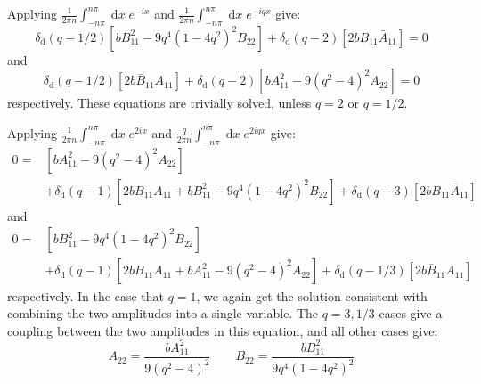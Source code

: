 \documentclass[api,pof,pre,12pt,a4paper]{revtex4-1}
\newcommand{\beqn}{\begin{equation}}
\newcommand{\eeqn}{\end{equation}}
\begin{document}
Applying $\tfrac{1}{2\pi n }\int_{- n\pi}^{n\pi}  \; \text{d}x\; e^{-ix}$ and $\tfrac{1}{2\pi n }\int_{- n\pi}^{n\pi}  \; \text{d}x\; e^{-i q x}$ give:
\beqn
\delta_{\text{d}}(q-1/2) \left[b B_{11}^2-9q^4 (1-4q^2)^2 B_{22}\right] +\delta_{\text{d}}(q-2) \left[2bB_{11}\bar{A}_{11} \right]=0
\eeqn
and
\beqn
\delta_{\text{d}}(q-1/2)\left[2b\bar{B}_{11} A_{11} \right]  +\delta_{\text{d}}(q-2) \left[b A_{11}^2-9 (q^2-4)^2 A_{22}\right]=0
\eeqn
respectively.  These equations are trivially solved, unless $q=2$ or $q=1/2$.  

Applying $\tfrac{1}{2\pi n}\int_{-n \pi}^{ n\pi}  \; \text{d}x\; e^{2i x}$  and $\tfrac{q}{2\pi n}\int_{-n\pi}^{n\pi}  \; \text{d}x\; e^{2iqx}$ give:
\begin{align}
0=&\left[b A_{11}^2-9 (q^2-4)^2 A_{22}\right]\nonumber \\
&+\delta_{\text{d}}(q-1) \left[2bB_{11}A_{11}+b B_{11}^2-9q^4 (1-4q^2)^2 B_{22}\right]+\delta_{\text{d}}(q-3) \left[2bB_{11}\bar{A}_{11}\right]
\end{align}
and
\begin{align}
0=&\left[b B_{11}^2-9q^4 (1-4q^2)^2 B_{22}\right]\nonumber \\
&+\delta_{\text{d}}(q-1) \left[2bB_{11}A_{11}+b A_{11}^2-9 (q^2-4)^2 A_{22}\right]+\delta_{\text{d}}(q-1/3) \left[2b\bar{B}_{11}A_{11}\right]
\end{align}
respectively.  In the case that $q=1$, we again get the solution consistent with combining the two amplitudes into a single variable.  The $q=3,1/3$ cases give a coupling between the two amplitudes in this equation, and all other cases give:
\beqn
A_{22}=\frac{bA_{11}^2}{9 (q^2-4)^2} \qquad B_{22}=\frac{bB_{11}^2}{9q^4 (1-4q^2)^2}
\eeqn
\end{document}

